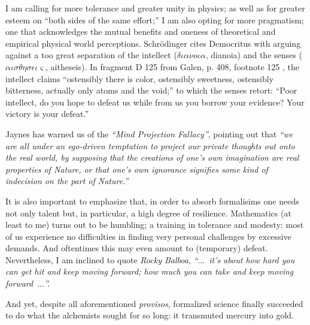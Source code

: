 {I am calling} for more tolerance and greater unity in physics;
as well as for greater esteem on ``both sides of the same effort;''
I am also opting for more pragmatism;
one that acknowledges the mutual benefits and oneness of
theoretical and empirical physical world perceptions.
Schr\"odinger\cite[-10mm]{schroed:natgr}
cites  Democritus with arguing against a too great separation of the  intellect ($\delta \iota {\alpha}\nu o \iota \alpha$, dianoia) and the senses
($\alpha \iota \sigma \theta {\eta} \sigma \epsilon \iota \varsigma$, aitheseis).
In fragment D 125 from Galen\cite{Diels-fdv}, p. 408, footnote 125 , the intellect claims
``ostensibly there is color, ostensibly sweetness, ostensibly bitterness, actually only atoms and the void;''
to which the senses retort:
``Poor intellect, do you hope to defeat us while from us you borrow your evidence? Your victory is your defeat.''

Jaynes has warned us of the {\em ``Mind Projection Fallacy''}\cite{jaynes-89,jaynes-90}, pointing out that
{\em ``we are all under an ego-driven temptation to project our private
thoughts out onto the real world, by supposing that the creations of one's own imagination are real
properties of Nature, or that one's own ignorance signifies some kind of indecision on the part of
Nature.''}


It is also important to emphasize that, in order to absorb formalisims one needs not only talent but,
in particular, a high degree of resilience.
Mathematics (at least to me) turns out to be humbling; a training in tolerance and modesty:
most of us experience no difficulties in
finding very personal challenges by excessive demands.
And oftentimes this may even amount to (temporary) defeat.
Nevertheless, I am inclined to quote {\it Rocky Balboa},
{\em ``$\ldots$~it's about how hard you can get hit and keep moving forward; how much you can take
and keep moving forward~$\ldots$''.}


And yet, despite all aforementioned {\it provisos}, formalized science finally succeeded to do what the alchemists sought for so long:
it transmuted mercury into gold\cite{PhysRev.60.473}.


